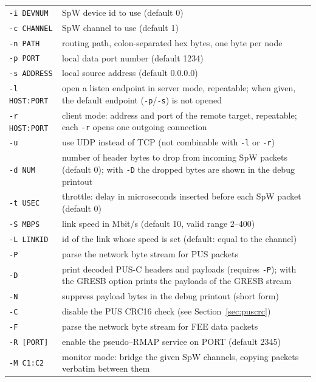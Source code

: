 \noindent
\begin{tabu} to 
	\texttt{-i DEVNUM}	& \gls{SpW} device id to use (default 0) \\
	\texttt{-c CHANNEL}	& \gls{SpW} channel to use (default 1) \\
	\texttt{-n PATH}	& routing path, colon-separated hex bytes, one byte per node \\
	\texttt{-p PORT}	& local data port number (default 1234) \\
	\texttt{-s ADDRESS}	& local source address (default 0.0.0.0) \\
	\texttt{-l HOST:PORT}& open a listen endpoint in server mode, repeatable; when given, the default endpoint (\texttt{-p}/\texttt{-s}) is not opened \\
	\texttt{-r HOST:PORT}& client mode: address and port of the remote target, repeatable; each \texttt{-r} opens one outgoing connection \\
	\texttt{-u}		& use UDP instead of TCP (not combinable with \texttt{-l} or \texttt{-r}) \\
	\texttt{-d NUM}		& number of header bytes to drop from incoming \gls{SpW} packets (default 0); with \texttt{-D} the dropped bytes are shown in the debug printout \\
	\texttt{-t USEC}	& throttle: delay in microseconds inserted before each \gls{SpW} packet (default 0) \\
	\texttt{-S MBPS}	& link speed in Mbit/s (default 10, valid range 2--400) \\
	\texttt{-L LINKID}	& id of the link whose speed is set (default: equal to the channel) \\
	\texttt{-P}		& parse the network byte stream for \gls{PUS} packets \\
	\texttt{-D}		& print decoded PUS-C headers and payloads (requires \texttt{-P}); with the GRESB option prints the payloads of the GRESB stream \\
	\texttt{-N}		& suppress payload bytes in the debug printout (short form) \\
	\texttt{-C}		& disable the PUS CRC16 check (see Section~\ref{sec:puscrc}) \\
	\texttt{-F}		& parse the network byte stream for FEE data packets \\
	\texttt{-R [PORT]}	& enable the pseudo--\gls{RMAP} service on PORT (default 2345) \\
	\texttt{-M C1:C2}	& monitor mode: bridge the given \gls{SpW} channels, copying packets verbatim between them \\

\end{tabu}
